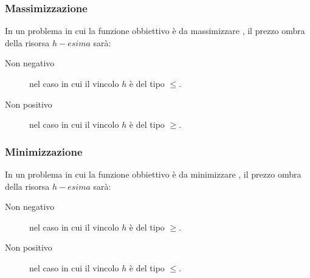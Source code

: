 \documentclass[\main/main.tex]{subfiles}
\begin{document}
\subsubsection{Massimizzazione}
In un problema in cui la funzione obbiettivo è da massimizzare , il prezzo ombra della risorsa $h-esima$ sarà:
\begin{description}
  \item[Non negativo] nel caso in cui il vincolo $h$ è del tipo $\leq$.
  \item[Non positivo] nel caso in cui il vincolo $h$ è del tipo $\geq$.
\end{description}

\subsubsection{Minimizzazione}
In un problema in cui la funzione obbiettivo è da minimizzare , il prezzo ombra della risorsa $h-esima$ sarà:
\begin{description}
  \item[Non negativo] nel caso in cui il vincolo $h$ è del tipo $\geq$.
  \item[Non positivo] nel caso in cui il vincolo $h$ è del tipo $\leq$.
\end{description}
\end{document}
